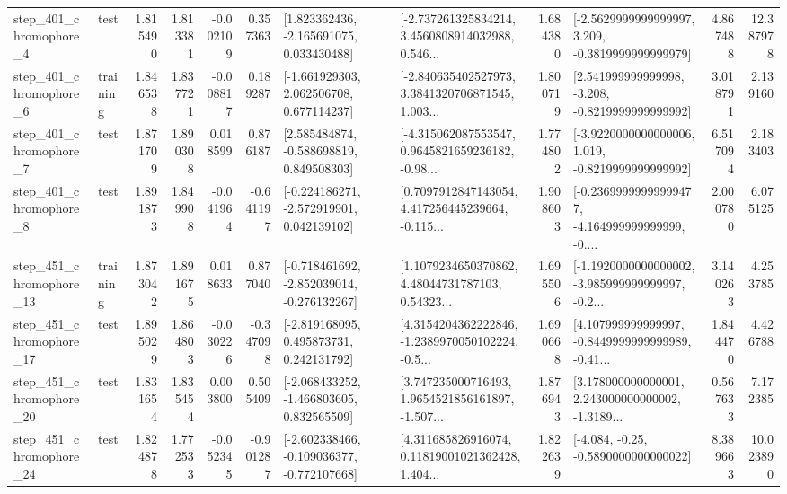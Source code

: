 \begin{tabular}{llrrrrllrlrr}
   step\_401\_chromophore\_4 &      test &      1.815490 &    1.813381 &     -0.002109 &  0.357363 &    [1.823362436, -2.165691075, 0.033430488] &  [-2.737261325834214, 3.4560808914032988, 0.546... &       1.684380 &  [-2.5629999999999997, 3.209, -0.3819999999999979] &            4.867488 &         12.387978 \\
   step\_401\_chromophore\_6 &  training &      1.846538 &    1.837721 &     -0.008817 &  0.189287 &    [-1.661929303, 2.062506708, 0.677114237] &  [-2.840635402527973, 3.3841320706871545, 1.003... &       1.800719 &   [2.541999999999998, -3.208, -0.8219999999999992] &            3.018791 &          2.139160 \\
   step\_401\_chromophore\_7 &      test &      1.871709 &    1.890308 &      0.018599 &  0.876187 &    [2.585484874, -0.588698819, 0.849508303] &  [-4.315062087553547, 0.9645821659236182, -0.98... &       1.774802 &  [-3.9220000000000006, 1.019, -0.8219999999999992] &            6.517094 &          2.183403 \\
   step\_401\_chromophore\_8 &      test &      1.891873 &    1.849908 &     -0.041964 & -0.641197 &   [-0.224186271, -2.572919901, 0.042139102] &  [0.7097912847143054, 4.417256445239664, -0.115... &       1.908603 &  [-0.23699999999999477, -4.164999999999999, -0.... &            2.000780 &          6.075125 \\
  step\_451\_chromophore\_13 &  training &      1.873042 &    1.891675 &      0.018633 &  0.877040 &  [-0.718461692, -2.852039014, -0.276132267] &  [1.1079234650370862, 4.48044731787103, 0.54323... &       1.695506 &  [-1.1920000000000002, -3.985999999999997, -0.2... &            3.140263 &          4.253785 \\
  step\_451\_chromophore\_17 &      test &      1.895029 &    1.864803 &     -0.030226 & -0.347098 &    [-2.819168095, 0.495873731, 0.242131792] &  [4.3154204362222846, -1.2389970050102224, -0.5... &       1.690668 &  [4.107999999999997, -0.8449999999999989, -0.41... &            1.844470 &          4.426788 \\
  step\_451\_chromophore\_20 &      test &      1.831654 &    1.835454 &      0.003800 &  0.505409 &   [-2.068433252, -1.466803605, 0.832565509] &  [3.747235000716493, 1.9654521856161897, -1.507... &       1.876943 &  [3.178000000000001, 2.243000000000002, -1.3189... &            0.567633 &          7.172385 \\
  step\_451\_chromophore\_24 &      test &      1.824878 &    1.772533 &     -0.052345 & -0.901287 &  [-2.602338466, -0.109036377, -0.772107668] &  [4.311685826916074, 0.11819001021362428, 1.404... &       1.822639 &               [-4.084, -0.25, -0.5890000000000022] &            8.389663 &         10.023890 \\

\end{tabular}
